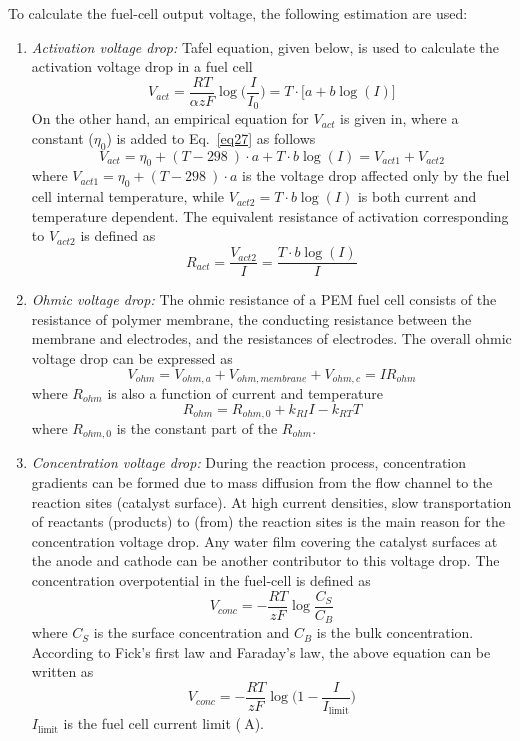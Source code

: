 \documentclass[12pt,a4paper]{scrartcl}
\begin{document}
\begin{onehalfspace}
To calculate the fuel-cell output voltage, the following estimation are used:
\begin{enumerate}
	\item \textit{Activation voltage drop:} Tafel equation, given below, is used to calculate the activation voltage drop in a fuel cell
	\begin{equation}\label{eq27}
		V_{act}=\frac{RT}{\alpha z F} \log\Big(\frac{I}{I_0}\Big) = T\cdot\Big[a+b\log(I)\Big]
	\end{equation}
	On the other hand, an empirical equation for $V_{act}$ is given in, where a constant ($\eta_0$) is added to Eq.~\eqref{eq27} as follows
	\begin{equation}\label{eq28}
		V_{act}=\eta_0+(T-\SI{298}{})\cdot a + T\cdot b\log(I)= V_{act1}+V_{act2}
	\end{equation}
	where $V_{act1}=\eta_0+(T-\SI{298}{})\cdot a$ is the voltage drop affected only by the fuel cell internal temperature, while $V_{act2}=T\cdot b\log(I)$ is both current and temperature dependent.
	The equivalent resistance of activation corresponding to $V_{act2}$ is defined as
	\begin{equation}\label{eq29}
		R_{act}=\frac{V_{act2}}{I} = \frac{T\cdot b\log(I)}{I}
	\end{equation}
	\item \textit{Ohmic voltage drop:} The ohmic resistance of a PEM fuel cell consists of the resistance of polymer membrane, the conducting resistance between the membrane and electrodes, and the resistances of electrodes. The overall ohmic voltage drop can be expressed as 
	\begin{equation}\label{eq30}
		V_{ohm} = V_{ohm,a} + V_{ohm,membrane} + V_{ohm,c} = IR_{ohm}
	\end{equation}
	where $R_{ohm}$ is also a function of current and temperature
	\begin{equation}\label{eq31}
		R_{ohm} = R_{ohm,0} + k_{RI}I - k_{RT}T
	\end{equation}
	where $R_{ohm,0}$ is the constant part of the $R_{ohm}$.
	\item \textit{Concentration voltage drop:} During the reaction process, concentration gradients can be formed due to mass diffusion from the flow channel to the reaction sites (catalyst surface). At high current densities, slow transportation of reactants (products) to (from) the reaction sites is the main reason for the concentration voltage drop. Any water film covering the catalyst surfaces at the anode and cathode can be another contributor to this voltage drop. The concentration overpotential in the fuel-cell is defined as
	\begin{equation}\label{eq32}
		V_{conc} = -\frac{RT}{zF}\log\frac{C_S}{C_B}
	\end{equation}
	where $C_S$ is the surface concentration and $C_B$ is the bulk concentration.
	According to Fick's first law and Faraday's law, the above equation can be written as 
	\begin{equation}\label{eq33}
		V_{conc}=-\frac{RT}{zF}\log\Big(1-\frac{I}{I_{\text{limit}}}\Big)
	\end{equation}  
$I_{\text{limit}}$ is the fuel cell current limit ($\SI{}{\ampere}$).


\end{enumerate}
\end{onehalfspace}
\end{document}
